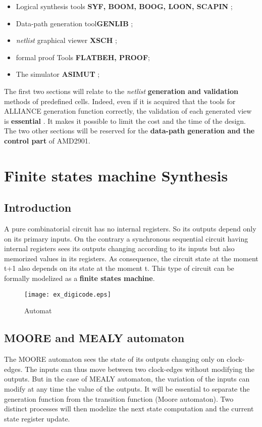 \documentclass[12pt]{article}
\begin{document}
{\begin{itemize}\itemsep=-.8ex
\item   Logical synthesis tools { \bf SYF, BOOM, BOOG, LOON, SCAPIN };
\item   Data-path generation tool{\bf GENLIB };
\item   { \it netlist } graphical viewer  { \bf XSCH };
\item   formal proof Tools {\bf FLATBEH, PROOF};
\item   The simulator { \bf ASIMUT };
\end{itemize}

The first two sections will relate to the { \it netlist } { \bf
generation and validation } methods of predefined cells. Indeed,
even if it is acquired that the tools for ALLIANCE generation
function correctly, the validation of each generated view is { \bf
essential }. It makes it possible to limit
the cost and the time of the design.  \\
The two other sections will be reserved for the { \bf data-path
generation and the control part } of AMD2901.

\section{Finite states machine Synthesis}

\subsection{Introduction}

A pure combinatorial circuit has no internal registers. So
its outputs depend only on its primary inputs. On the contrary 
a synchronous sequential circuit having internal registers sees its
outputs changing according to its inputs but also memorized values
in its registers. As consequence, the circuit state at the moment
t+1 also depends on its state at the moment t. This type of
circuit can be formally modelized as a { \bf finite states machine}.

\begin{figure}[H]\centering
  \texttt{[image: ex\_digicode.eps]}
 \caption{Automat}
  \label{Fig:ex_digicode}
\end{figure}

\subsection{MOORE and MEALY automaton}
The MOORE automaton sees the state of its outputs changing only on
clock-edges. The inputs can thus move between two clock-edges
without modifying the outputs. But in the case of MEALY automaton,
the variation of the inputs can modify at any time the value of
the outputs. It will be essential to separate the generation
function from the transition function (Moore automaton).
Two distinct processes will then modelize the next state computation
and the current state register update.

}
\end{document}

